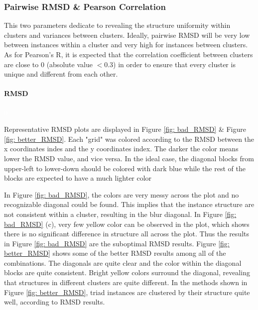 \documentclass[a4paper]{article}
\begin{document}
\subsubsection{Pairwise RMSD \& Pearson Correlation}
This two parameters dedicate to revealing the structure uniformity within clusters and variances between clusters. Ideally, pairwise RMSD will be very low between instances within a cluster and very high for instances between clusters. As for Pearson's R, it is expected that the correlation coefficient between clusters are close to 0 (absolute value \(< 0.3\)) in order to ensure that every cluster is unique and different from each other.

\paragraph{RMSD}
\textcolor{white}{0} 

Representative RMSD plots are displayed in Figure \ref{fig: bad_RMSD} \& Figure \ref{fig: better_RMSD}. Each "grid" was colored according to the RMSD between the x coordinates indes and the y coordinates index. The darker the color means lower the RMSD value, and vice versa. In the ideal case, the diagonal blocks from upper-left to lower-down should be colored with dark blue while the rest of the blocks are expected to have a much lighter color

In Figure \ref{fig: bad_RMSD}, the colors are very messy across the plot and no recognizable diagonal could be found. This implies that the instance structure are not consistent within a cluster, resulting in the blur diagonal. In Figure \ref{fig: bad_RMSD} (c), very few yellow color can be observed in the plot, which shows there is no significant difference in structure all across the plot. Thus the results in Figure \ref{fig: bad_RMSD} are the suboptimal RMSD results. Figure \ref{fig: better_RMSD} shows some of the better RMSD results among all of the combinations. The diagonals are quite clear and the color within the diagonal blocks are quite consistent. Bright yellow colors surround the diagonal, revealing that structures in different clusters are quite different. In the methods shown in Figure \ref{fig: better_RMSD}, triad instances are clustered by their structure quite well, according to RMSD results.
\end{document}
